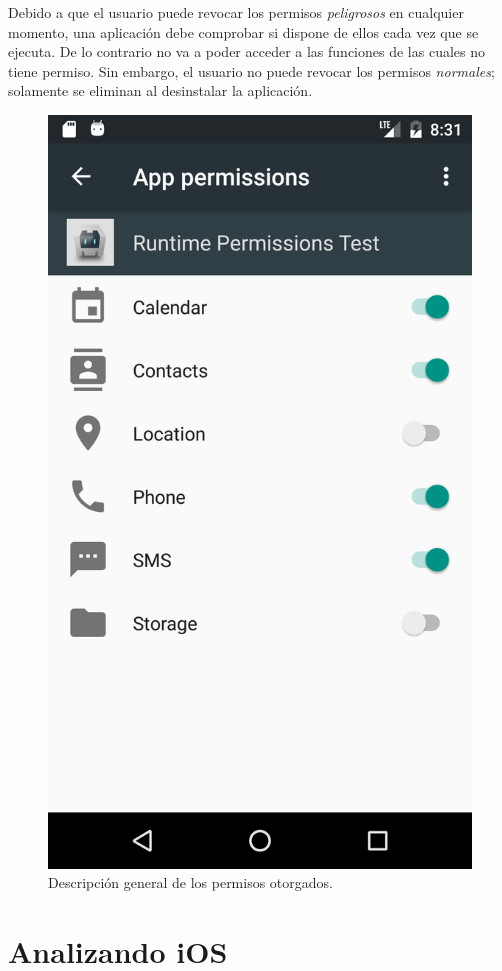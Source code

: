 Debido a que el usuario puede revocar los permisos \emph{peligrosos} en cualquier momento, una aplicación debe comprobar si dispone de ellos cada vez que se ejecuta. De lo contrario no va a poder acceder a las funciones de las cuales no tiene permiso. Sin embargo, el usuario no puede revocar los permisos \emph{normales}; solamente se eliminan al desinstalar la aplicación.
\begin{figure}[btp]
    \centering
        \includegraphics[width=.3\linewidth]{imgs/chapter1/app-permissions}
    \caption{Descripción general de los permisos otorgados.}
	\label{fig:ch03:app-permissions-overview}
\end{figure}
\section{Analizando iOS}
